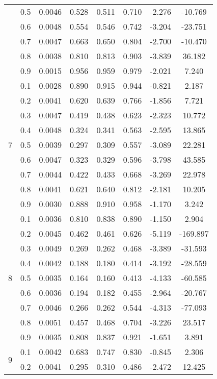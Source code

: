 \documentclass[11pt,a4paper]{report}
\begin{document}
\begin{longtable}{ | c | c || c | c | c | c | c | c | }
 & 0.5 & 0.0046 & 0.528 & 0.511 & 0.710 & -2.276 & -10.769 \\
 & 0.6 & 0.0048 & 0.554 & 0.546 & 0.742 & -3.204 & -23.751 \\
 & 0.7 & 0.0047 & 0.663 & 0.650 & 0.804 & -2.700 & -10.470 \\
 & 0.8 & 0.0038 & 0.810 & 0.813 & 0.903 & -3.839 & 36.182 \\
 & 0.9 & 0.0015 & 0.956 & 0.959 & 0.979 & -2.021 & 7.240 \\
 \hline
\multirow{9}{*}{7} & 0.1 & 0.0028 & 0.890 & 0.915 & 0.944 & -0.821 & 2.187 \\
 & 0.2 & 0.0041 & 0.620 & 0.639 & 0.766 & -1.856 & 7.721 \\
 & 0.3 & 0.0047 & 0.419 & 0.438 & 0.623 & -2.323 & 10.772 \\
 & 0.4 & 0.0048 & 0.324 & 0.341 & 0.563 & -2.595 & 13.865 \\
 & 0.5 & 0.0039 & 0.297 & 0.309 & 0.557 & -3.089 & 22.281 \\
 & 0.6 & 0.0047 & 0.323 & 0.329 & 0.596 & -3.798 & 43.585 \\
 & 0.7 & 0.0044 & 0.422 & 0.433 & 0.668 & -3.269 & 22.978 \\
 & 0.8 & 0.0041 & 0.621 & 0.640 & 0.812 & -2.181 & 10.205 \\
 & 0.9 & 0.0030 & 0.888 & 0.910 & 0.958 & -1.170 & 3.242 \\
 \hline
\multirow{9}{*}{8} & 0.1 & 0.0036 & 0.810 & 0.838 & 0.890 & -1.150 & 2.904 \\
 & 0.2 & 0.0045 & 0.462 & 0.461 & 0.626 & -5.119 & -169.897 \\
 & 0.3 & 0.0049 & 0.269 & 0.262 & 0.468 & -3.389 & -31.593 \\
 & 0.4 & 0.0042 & 0.188 & 0.180 & 0.414 & -3.192 & -28.559 \\
 & 0.5 & 0.0035 & 0.164 & 0.160 & 0.413 & -4.133 & -60.585 \\
 & 0.6 & 0.0036 & 0.194 & 0.182 & 0.455 & -2.964 & -20.767 \\
 & 0.7 & 0.0046 & 0.266 & 0.262 & 0.544 & -4.313 & -77.093 \\
 & 0.8 & 0.0051 & 0.457 & 0.468 & 0.704 & -3.226 & 23.517 \\
 & 0.9 & 0.0035 & 0.808 & 0.837 & 0.921 & -1.651 & 3.891 \\
 \hline
\multirow{9}{*}{9} & 0.1 & 0.0042 & 0.683 & 0.747 & 0.830 & -0.845 & 2.306 \\
 & 0.2 & 0.0041 & 0.295 & 0.310 & 0.486 & -2.472 & 12.425 \\

\end{longtable}
\end{document}
